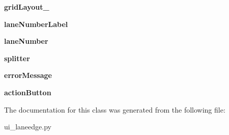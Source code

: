 \begin{DoxyCompactItemize}
\item 
\hypertarget{class_sim_g_d_c_1_1ui__laneedge_1_1_ui___lane_edge_a3523d7450578528abc388a1ece797aed}{}{\bfseries grid\+Layout\+\_}\label{class_sim_g_d_c_1_1ui__laneedge_1_1_ui___lane_edge_a3523d7450578528abc388a1ece797aed}

\item 
\hypertarget{class_sim_g_d_c_1_1ui__laneedge_1_1_ui___lane_edge_a554810270383866df2d905ccc46baf3e}{}{\bfseries lane\+Number\+Label}\label{class_sim_g_d_c_1_1ui__laneedge_1_1_ui___lane_edge_a554810270383866df2d905ccc46baf3e}

\item 
\hypertarget{class_sim_g_d_c_1_1ui__laneedge_1_1_ui___lane_edge_abde32aeafdc6526a42bd5434f8ccc056}{}{\bfseries lane\+Number}\label{class_sim_g_d_c_1_1ui__laneedge_1_1_ui___lane_edge_abde32aeafdc6526a42bd5434f8ccc056}

\item 
\hypertarget{class_sim_g_d_c_1_1ui__laneedge_1_1_ui___lane_edge_a43175d3c3f84e5b05e2079ff99dab072}{}{\bfseries splitter}\label{class_sim_g_d_c_1_1ui__laneedge_1_1_ui___lane_edge_a43175d3c3f84e5b05e2079ff99dab072}

\item 
\hypertarget{class_sim_g_d_c_1_1ui__laneedge_1_1_ui___lane_edge_a89916dd76276d08a4652c952791280d5}{}{\bfseries error\+Message}\label{class_sim_g_d_c_1_1ui__laneedge_1_1_ui___lane_edge_a89916dd76276d08a4652c952791280d5}

\item 
\hypertarget{class_sim_g_d_c_1_1ui__laneedge_1_1_ui___lane_edge_a8ed1b2472b9b5331e29c4f774633e2ed}{}{\bfseries action\+Button}\label{class_sim_g_d_c_1_1ui__laneedge_1_1_ui___lane_edge_a8ed1b2472b9b5331e29c4f774633e2ed}

\end{DoxyCompactItemize}


The documentation for this class was generated from the following file\+:\begin{DoxyCompactItemize}
\item 
ui\+\_\+laneedge.\+py\end{DoxyCompactItemize}
